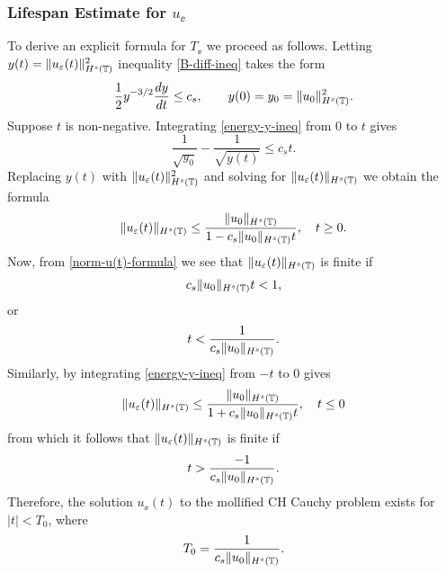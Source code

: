 \subsubsection{Lifespan Estimate for $u_\ee$} To derive an explicit formula for
$T_\ee$ we proceed as follows.  Letting  $y(t)=
\|u_\varepsilon(t)\|_{H^s(\mathbb{T})}^2$ inequality  \eqref{B-diff-ineq} takes the
form
%
\begin{equation} 
\label{energy-y-ineq}
\frac 12
y^{-3/2}\frac{dy}{dt}
\le
c_s,
\qquad
y(0)=y_0=  \|u_0\|_{H^s(\mathbb{T})}^2.
\end{equation}
%
Suppose $t$ is non-negative. Integrating  \eqref{energy-y-ineq} from  0  to $t$ gives
%
\begin{equation} 
\label{energy-y-ineq-calc1}
\frac{1}{\sqrt{y_0}}  - \frac{1}{\sqrt{y(t)}} 
\le
c_s t.
\end{equation}
%
%
Replacing $y(t)$ with   $\|u_\varepsilon(t)\|_{H^s(\mathbb{T})}^2$  and solving for  $\|u_\varepsilon(t)\|_{H^s(\mathbb{T})}$
we obtain the formula
%
\begin{equation} 
\label{norm-u(t)-formula}
\|u_\varepsilon(t)\|_{H^s(\mathbb{T})}
\le
\frac{\|u_0\|_{H^s(\mathbb{T})}}{1-c_s\|u_0\|_{H^s(\mathbb{T})} t}, \quad t\ge
0.
\end{equation}
%
Now, from \eqref{norm-u(t)-formula} we see that  $\|u_\varepsilon(t)\|_{H^s(\mathbb{T})}$ is finite  if 
%
\begin{equation*} 
\label{Lifespan-calc1}
c_s    \|u_0\|_{H^s(\mathbb{T})} t<1,
\end{equation*}
%
or
%
\begin{equation} 
t
<
\frac{1}{c_s \|u_0\|_{H^s(\mathbb{T})}}.
\end{equation}
%
Similarly, 
by integrating  \eqref{energy-y-ineq} from  $-t$ to $0$ gives
\begin{equation} 
\label{norm-u(t)-formula-prime}
\|u_\varepsilon(t)\|_{H^s(\mathbb{T})}
\le
\frac{\|u_0\|_{H^s(\mathbb{T})}}{1+c_s\|u_0\|_{H^s(\mathbb{T})} t}, \quad t \le 0
\end{equation}
from which it follows that $\|u_\varepsilon(t)\|_{H^s(\mathbb{T})}$ is finite  if 
%
\begin{equation} 
t
>
\frac{-1}{c_s \|u_0\|_{H^s(\mathbb{T})}}.
\end{equation}
Therefore, the  solution  $u_\ee(t)$ to the mollified CH Cauchy
problem exists for $|t| <T_0$, where
%
\begin{equation} 
\label{CH-Lifespan}
T_0
=
\frac{1}{c_s \|u_0\|_{H^s(\mathbb{T})}}.
\end{equation}
%
%  
% 
%
%
%   
%
\noindent
